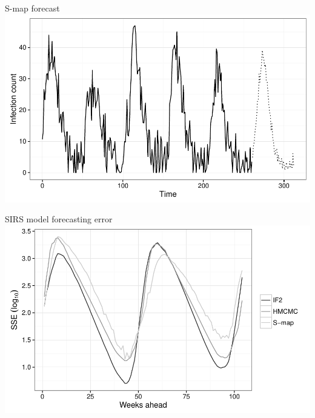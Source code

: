 \documentclass[12pt]{beamer}
\begin{document}
\begin{frame}

	\null
	\large
	S-map forecast \\
	\vspace{\baselineskip}
	\includegraphics[width=\textwidth,height=\textheight,keepaspectratio=true]{../../writing/SIRS-SMAP/images/smap-project}

\end{frame}

\begin{frame}

	\null
	\large
	SIRS model forecasting error \\
	\vspace{\baselineskip}
	\includegraphics[width=\textwidth,height=\textheight,keepaspectratio=true]{../../writing/SIRS-SMAP/images/sseplot}

\end{frame}
\end{document}
